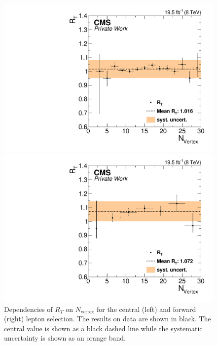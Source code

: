 \begin{figure}[htbp]
\centering
\begin{minipage}[t]{0.49\textwidth}
  \includegraphics[width=\textwidth]{plots/BG/trigger/Triggereff_SFvsOF_Syst_AlphaT_HighHTExclusiveCentral_Full2012_nVtx_None.pdf}
\end{minipage}
\begin{minipage}[t]{0.49\textwidth}
\includegraphics[width=\textwidth]{plots/BG/trigger/Triggereff_SFvsOF_Syst_AlphaT_HighHTExclusiveForward_Full2012_nVtx_None.pdf}
\end{minipage}
\caption{Dependencies of $R_T$ on $N_{\text{vertex}}$ for the central (left) and forward (right) lepton selection. The results on data are shown in black. The central value is shown as a black dashed line while the systematic uncertainty is shown as an orange band.}
\label{fig:RTDependenciesApp3}
\end{figure}  
